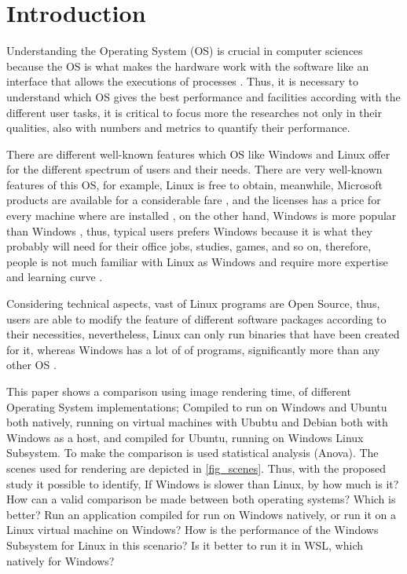 \documentclass[conference]{IEEEtran}
\begin{document}
\section{Introduction}
Understanding the Operating System (OS) is crucial in computer sciences because the OS is what makes the
hardware work with the software like an
interface that allows the executions of processes \cite{dhamija2012demographics}. Thus, it is necessary to understand which OS gives the best performance and facilities according with the different user tasks, it is critical to focus more the researches not only in their qualities, also with numbers and metrics to quantify their performance. \par
There are different well-known features which OS like Windows and Linux offer for the different spectrum of users and their needs. There are very well-known features of this OS, for example, Linux is free to obtain, meanwhile, Microsoft products are available for a considerable fare \cite{dhamija2012demographics}, and the licenses has a price for every machine where are installed  \cite{duran2006analisis}, on the other hand, Windows is more popular than Windows \cite{duran2006analisis}, thus, typical users prefers Windows because it is what they probably will need for their office jobs, studies, games, and so on, therefore, people is not much familiar with Linux as Windows and require more expertise and learning curve \cite{dhamija2012demographics}.\par
Considering technical aspects, vast of Linux programs are Open Source, thus, users are able to modify the feature of different software packages according to their necessities, nevertheless, Linux can only run binaries that have been  created for it, whereas Windows has a lot of of programs, significantly more than any other OS \cite{dhamija2012demographics}.\par

This paper shows a comparison using image rendering time, of different Operating System implementations; Compiled to run on Windows and Ubuntu both natively, running on virtual machines with Ububtu and Debian both with Windows as a host, and compiled for Ubuntu, running on Windows Linux Subsystem. To make the comparison is used statistical analysis (Anova). The scenes used for rendering are depicted in \ref{fig_scenes}. Thus, with the proposed study it possible to identify, If Windows is slower than Linux, by how much is it? How can a valid comparison be made between
both operating systems? Which is better? Run an application compiled for
run on Windows natively, or run it on a
Linux virtual machine on Windows? How is the performance of the Windows Subsystem for 
Linux in this scenario? Is it better to run it in WSL,
which natively for Windows?
\end{document}
